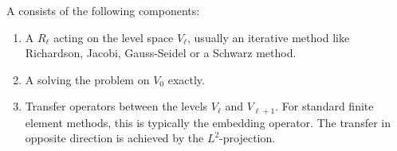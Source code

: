 \begin{definition}
  A  consists of the following components:
  \begin{enumerate}
  \item A  $R_\ell$ acting on the level space
    $V_\ell$, usually an iterative method like Richardson, Jacobi,
    Gauss-Seidel or a Schwarz method.
  \item A  solving the problem on $V_0$
    exactly.
  \item Transfer operators between the levels $V_{\ell}$ and
    $V_{\ell+1}$. For standard finite element methods, this is
    typically the embedding operator. The transfer in opposite
    direction is achieved by the $L^2$-projection.
  \end{enumerate}
  

\end{definition}
